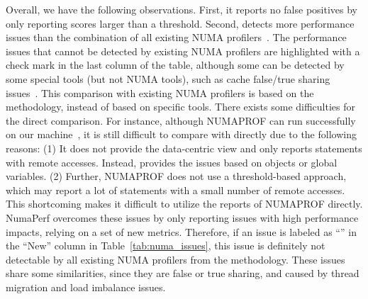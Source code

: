 Overall, we have the following observations. First, it reports no false positives by only reporting scores larger than a threshold. Second, \NP{} 
detects more performance issues than the combination of all existing NUMA profilers~\cite{Intel:VTune, Memphis, Lachaize:2012:MMP:2342821.2342826, XuNuma, NumaMMA, 7847070, diener2015characterizing, valat:2018:numaprof}. The performance issues that cannot be detected by existing NUMA profilers are highlighted with a check mark in the last column of the table, although some can be detected by some special tools (but not NUMA tools), such as cache false/true sharing issues~\cite{Sheriff, Predator, Cheetah, DBLP:conf/ppopp/ChabbiWL18, helm2019perfmemplus}. This comparison with existing NUMA profilers is based on the methodology, instead of based on specific tools. There exists some difficulties for the direct comparison. For instance, although  NUMAPROF can run successfully on our machine~\cite{valat:2018:numaprof}, it is still difficult to compare with directly due to the following reasons: (1) It does not provide the data-centric view and only reports statements with remote accesses. Instead, \NP{} provides the issues based on objects or global variables. (2) Further, NUMAPROF does not use a threshold-based approach, which may report a lot of statements with a small number of remote accesses. This shortcoming makes it difficult to utilize the reports of NUMAPROF directly. NumaPerf overcomes these issues by only reporting issues with high performance impacts, relying on a set of new metrics. Therefore, if an issue is labeled as ``\checkmark'' in the ``New'' column in Table~\ref{tab:numa_issues}, this issue is definitely not detectable by all existing NUMA profilers from the methodology. These issues share some similarities, since they are false or true sharing, and caused by thread migration and load imbalance issues. 


